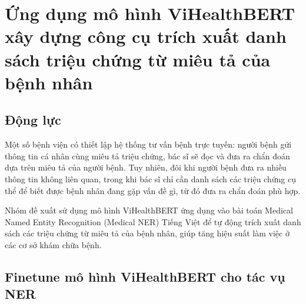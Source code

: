 \section{Ứng dụng mô hình ViHealthBERT xây dựng công cụ trích xuất danh sách triệu chứng từ miêu tả của bệnh nhân}
\subsection{Động lực}
Một số bệnh viện có thiết lập hệ thống tư vấn bệnh trực tuyến: người bệnh gửi thông tin cá nhân cùng miêu tả triệu chứng, bác sĩ sẽ đọc và đưa ra chẩn đoán dựa trên miêu tả của người bệnh. Tuy nhiên, đôi khi người bệnh đưa ra nhiều thông tin không liên quan, trong khi bác sĩ chỉ cần danh sách các triệu chứng cụ thể để biết được bệnh nhân đang gặp vấn đề gì, từ đó đưa ra chẩn đoán phù hợp.

Nhóm đề xuất sử dụng mô hình ViHealthBERT ứng dụng vào bài toán Medical Named Entity Recognition (Medical NER) Tiếng Việt để tự động trích xuất danh sách các triệu chứng từ miêu tả của bệnh nhân, giúp tăng hiệu suất làm việc ở các cơ sở khám chữa bệnh.

\subsection{Finetune mô hình ViHealthBERT cho tác vụ NER}
